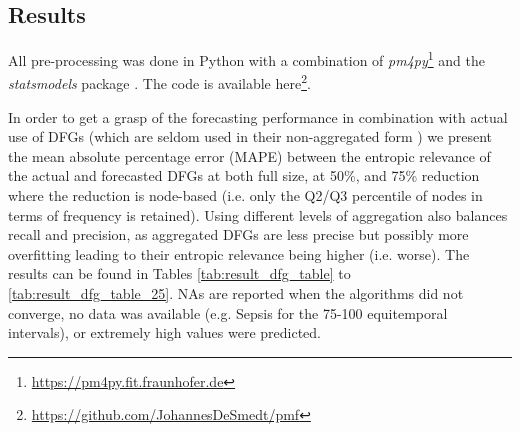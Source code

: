 
\subsection{Results}
All pre-processing was done in Python with a combination of \emph{pm4py}\footnote{\url{https://pm4py.fit.fraunhofer.de}} and the \emph{statsmodels} package \cite{seabold2010statsmodels}. 
The code is available here\footnote{\url{https://github.com/JohannesDeSmedt/pmf}}.

In order to get a grasp of the forecasting performance in combination with actual use of DFGs (which are seldom used in their non-aggregated form \cite{van2019practitioner}) we present the mean absolute percentage error (MAPE) between the entropic relevance of the actual and forecasted DFGs at both full size, at 50\%, and 75\% reduction where the reduction is node-based (i.e. only the Q2/Q3 percentile of nodes in terms of frequency is retained).
Using different levels of aggregation also balances recall and precision, as aggregated DFGs are less precise but possibly more overfitting leading to their entropic relevance being higher (i.e. worse).
The results can be found in Tables \ref{tab:result_dfg_table} to \ref{tab:result_dfg_table_25}.
NAs are reported when the algorithms did not converge, no data was available (e.g. Sepsis for the 75-100 equitemporal intervals), or extremely high values were predicted.

